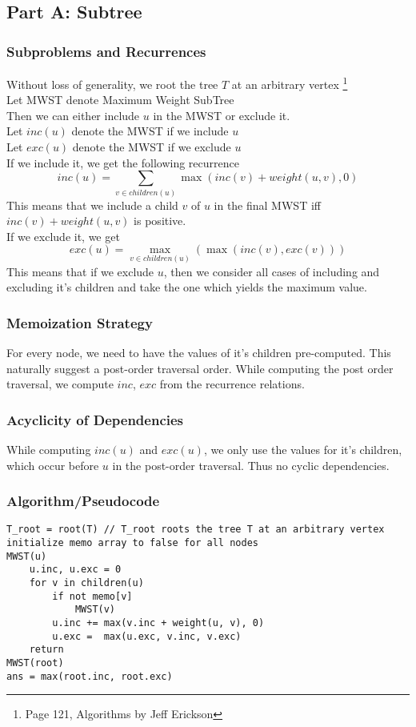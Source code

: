 \documentclass[11pt, fleqn]{article}
\begin{document}
\subsection*{Part A: Subtree}
\subsubsection*{Subproblems and Recurrences}
Without loss of generality, we root the tree $T$ at an arbitrary vertex \footnote{Page 121, Algorithms by Jeff Erickson}\\
Let MWST denote Maximum Weight SubTree\\
Then we can either include $u$ in the MWST or exclude it.\\
Let $inc(u)$ denote the MWST if we include $u$\\
Let $exc(u)$ denote the MWST if we exclude $u$\\
If we include it, we get the following recurrence 
$$
    inc(u) = \sum_{v \in children(u)} \max(inc(v) + weight(u, v), 0)
$$
This means that we include a child $v$ of $u$ in the final MWST iff $inc(v) + weight(u, v)$ is positive.\\
If we exclude it, we get
$$
    exc(u) = \max_{v \in children(u)}(\max(inc(v), exc(v)))
$$
This means that if we exclude $u$, then we consider all cases of including and excluding it's children and take the one which yields the maximum value.

\subsubsection*{Memoization Strategy}
For every node, we need to have the values of it's children pre-computed. This naturally suggest a post-order traversal order. While computing the post order traversal, we compute $inc$, $exc$ from the recurrence relations.

\subsubsection*{Acyclicity of Dependencies}
While computing $inc(u)$ and $exc(u)$, we only use the values for it's children, which occur before $u$ in the post-order traversal. Thus no cyclic dependencies.

\newpage
\subsubsection*{Algorithm/Pseudocode}
\begin{verbatim}
T_root = root(T) // T_root roots the tree T at an arbitrary vertex
initialize memo array to false for all nodes
MWST(u)
    u.inc, u.exc = 0
    for v in children(u)
        if not memo[v]
            MWST(v)
        u.inc += max(v.inc + weight(u, v), 0)
        u.exc =  max(u.exc, v.inc, v.exc)
    return
MWST(root)
ans = max(root.inc, root.exc)
\end{verbatim}
\end{document}

